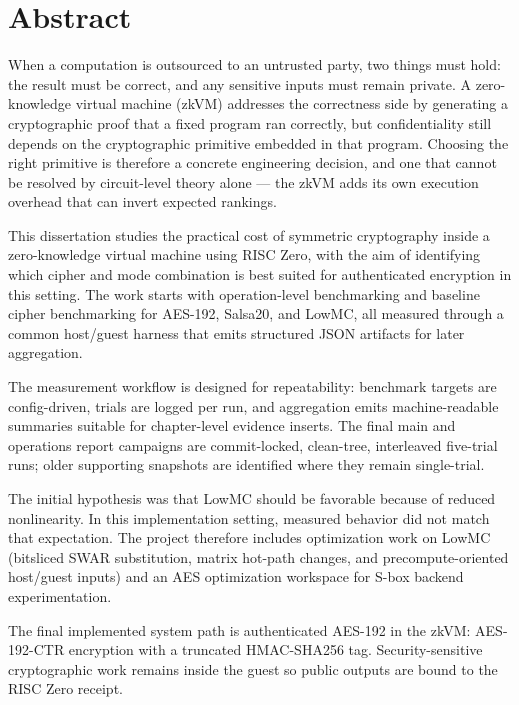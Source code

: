 
\chapter*{Abstract}

When a computation is outsourced to an untrusted party, two things must hold:
the result must be correct, and any sensitive inputs must remain private. A
zero-knowledge virtual machine (zkVM) addresses the correctness side by
generating a cryptographic proof that a fixed program ran correctly, but
confidentiality still depends on the cryptographic primitive embedded in that
program. Choosing the right primitive is therefore a concrete engineering
decision, and one that cannot be resolved by circuit-level theory alone --- the
zkVM adds its own execution overhead that can invert expected rankings.

This dissertation studies the practical cost of symmetric cryptography inside a
zero-knowledge virtual machine using RISC Zero, with the aim of identifying
which cipher and mode combination is best suited for authenticated encryption in
this setting. The work starts with operation-level benchmarking and baseline
cipher benchmarking for AES-192, Salsa20, and LowMC, all measured through a
common host/guest harness that emits structured JSON artifacts for later
aggregation.

The measurement workflow is designed for repeatability: benchmark targets are
config-driven, trials are logged per run, and aggregation emits machine-readable
summaries suitable for chapter-level evidence inserts. The final main and
operations report campaigns are commit-locked, clean-tree, interleaved
five-trial runs; older supporting snapshots are identified where they remain
single-trial.

The initial hypothesis was that LowMC should be favorable because of reduced
nonlinearity. In this implementation setting, measured behavior did not match
that expectation. The project therefore includes optimization work on LowMC
(bitsliced SWAR substitution, matrix hot-path changes, and precompute-oriented
host/guest inputs) and an AES optimization workspace for S-box backend
experimentation.

The final implemented system path is authenticated AES-192 in the zkVM:
AES-192-CTR encryption with a truncated HMAC-SHA256 tag. Security-sensitive
cryptographic work remains inside the guest so public outputs are bound to the
RISC Zero receipt.


